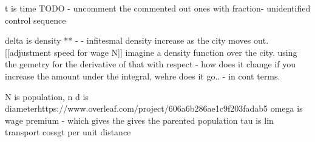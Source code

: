 

%  


t is time
TODO - uncomment the commented out ones with fraction- unidentified control sequence


delta is density ** - - infitesmal density increase as the city moves out. [[adjustment speed for wage N]] imagine a density function over the city. 
using the gemetry for the derivative of that with respect - how does it change if you increase the amount under the integral, wehre does it go..  - in cont terms.  

N is population, n
d is diameterhttps://www.overleaf.com/project/606a6b286ae1c9f203fadab5
omega is wage premium - which gives the gives the parented population
tau is lin transport cossgt per unit distance



